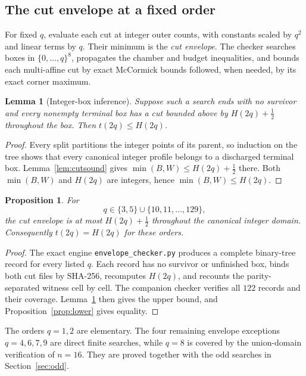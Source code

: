 \documentclass[11pt]{amsart}
\newtheorem{lemma}[theorem]{Lemma}
\newtheorem{proposition}[theorem]{Proposition}
\theoremstyle{definition}
\theoremstyle{remark}
\newcommand{\bs}{\discretionary{}{}{}}
\begin{document}
\subsection{The cut envelope at a fixed order}

For fixed $q$, evaluate each cut at integer outer counts, with constants
scaled by $q^2$ and linear terms by $q$.  Their minimum is the
\emph{cut envelope}.  The checker searches boxes in $\{0,\ldots,q\}^8$,
propagates the chamber and budget inequalities, and bounds each multi-affine
cut by exact McCormick bounds followed, when needed, by its exact corner
maximum.

\begin{lemma}[Integer-box inference]\label{lem:boxsound}
Suppose such a search ends with no survivor and every nonempty terminal box
has a cut bounded above by $H(2q)+\frac12$ throughout the box.  Then
$t(2q)\le H(2q)$.
\end{lemma}

\begin{proof}
Every split partitions the integer points of its parent, so induction on the
tree shows that every canonical integer profile belongs to a discharged
terminal box.  Lemma~\ref{lem:cutsound} gives
$\min(B,W)\le H(2q)+\frac12$ there.  Both $\min(B,W)$ and $H(2q)$ are
integers, hence $\min(B,W)\le H(2q)$.
\end{proof}

\begin{proposition}\label{prop:ladder}
For
\[
q\in\{3,5\}\cup\{10,11,\ldots,129\},
\]
the cut envelope is at most $H(2q)+\frac12$ throughout the canonical integer
domain.  Consequently $t(2q)=H(2q)$ for these orders.
\end{proposition}

\begin{proof}
The exact engine \texttt{envelope\_\bs{}checker.py} produces a complete
binary-tree record for every listed $q$.  Each record has no survivor or
unfinished box, binds both cut files by SHA-256, recomputes $H(2q)$, and
recounts the parity-separated witness cell by cell.  The companion checker
verifies all $122$ records and their coverage.  Lemma~\ref{lem:boxsound}
then gives the upper bound, and Proposition~\ref{prop:lower} gives equality.
\end{proof}

The orders $q=1,2$ are elementary.  The four remaining envelope exceptions
$q=4,6,7,9$ are direct finite searches, while $q=8$ is covered by the
union-domain verification of $n=16$.  They are proved together with the odd
searches in Section~\ref{sec:odd}.
\end{document}

